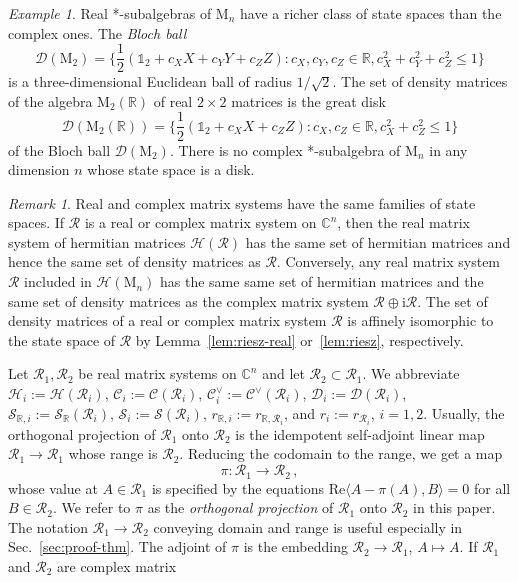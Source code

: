 \documentclass[a4paper,11pt,reqno]{amsart}
\newcommand{\C}{\mathbb{C}}
\newcommand{\R}{\mathbb{R}}
\newcommand{\M}{\mathrm{M}}
\newcommand{\cC}{\mathcal{C}}
\newcommand{\cD}{\mathcal{D}}
\newcommand{\cH}{\mathcal{H}}
\newcommand{\cR}{\mathcal{R}}
\newcommand{\cS}{\mathcal{S}}
\newcommand{\ii}{\mathrm{i}}
\newcommand{\id}{\mathds{1}}
\renewcommand\Re{\mathrm{Re}}
\theoremstyle{definition}
\theoremstyle{remark}
\newtheorem{rem}[thm]{Remark}
\newtheorem{exa}[thm]{Example}
\numberwithin{equation}{section}
\begin{document}
%
\begin{exa}\label{ex:Bloch}
Real *-subalgebras of $\M_n$ have a richer class of state spaces than the 
complex ones. The \emph{Bloch ball} \cite[Sec.~5.2]{BengtssonZyczkowski2017} 
\[\textstyle
\cD(\M_2)=\big\{\frac{1}{2}(\id_2+c_XX+c_YY+c_ZZ)
\colon c_X,c_Y,c_Z\in\R, c_X^2+c_Y^2+c_Z^2\leq 1\big\}
\]
is a three-dimensional Euclidean ball of radius $1/\sqrt{2}$. The set of 
density matrices of the algebra $\M_2(\R)$ of real $2\times 2$ matrices 
is the great disk 
\[\textstyle
\cD(\M_2(\R))=\big\{\frac{1}{2}(\id_2+c_XX+c_ZZ)
\colon c_X,c_Z\in\R, c_X^2+c_Z^2\leq 1\big\}
\]
of the Bloch ball $\cD(\M_2)$. There is no complex *-subalgebra of $\M_n$ 
in any dimension $n$ whose state space is a disk.
\end{exa}
%
\begin{rem}\label{rem:realvscomplex}
Real and complex matrix systems have the same families of state spaces. If 
$\cR$ is a real or complex matrix system on $\C^n$, then the real matrix 
system of hermitian matrices $\cH(\cR)$ has the same set of hermitian 
matrices and hence the same set of density matrices as $\cR$. Conversely, 
any real matrix system $\cR$ included in $\cH(\M_n)$ has the same same set 
of hermitian matrices and the same set of density matrices as the complex 
matrix system $\cR\oplus\ii\cR$. The set of density matrices of a real
or complex matrix system $\cR$ is affinely isomorphic to the state space of
$\cR$ by Lemma~\ref{lem:riesz-real} or~\ref{lem:riesz}, respectively.
\end{rem}
%
Let $\cR_1,\cR_2$ be real matrix systems on $\C^n$ and let $\cR_2\subset\cR_1$. 
We abbreviate
$\cH_i:=\cH(\cR_i)$,
$\cC_i:=\cC(\cR_i)$,
$\cC_i^\vee:=\cC^\vee(\cR_i)$,
$\cD_i:=\cD(\cR_i)$,  
$\cS_{\R,i}:=\cS_\R(\cR_i)$,
$\cS_i:=\cS(\cR_i)$, 
$r_{\R,i}:=r_{\R,\cR_i}$, and
$r_i:=r_{\cR_i}$, $i=1,2$.
Usually, the orthogonal projection of $\cR_1$ onto $\cR_2$ is the idempotent 
self-adjoint linear map $\cR_1\to\cR_1$ whose range is $\cR_2$. Reducing the 
codomain to the range, we get a map
\begin{equation}\label{eq:pi-red1}
\pi:\cR_1\to\cR_2\,,
\end{equation}
whose value at $A\in\cR_1$ is specified by the equations
$\Re\langle A-\pi(A),B\rangle=0$ for all $B\in\cR_2$. We refer to $\pi$ as 
the \emph{orthogonal projection} of $\cR_1$ onto $\cR_2$ in this paper. The 
notation $\cR_1\to\cR_2$ conveying domain and range is useful especially in 
Sec.~\ref{sec:proof-thm}. The adjoint of $\pi$ is the embedding 
$\cR_2\to\cR_1$, $A\mapsto A$. If $\cR_1$ and $\cR_2$ are complex matrix 
\end{document}
